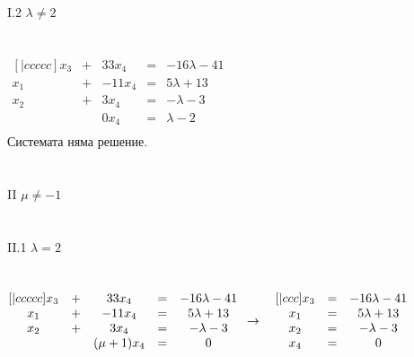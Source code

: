 \documentclass{article}
\begin{document}
    I.2 \(\lambda \neq 2\)\\
    \\
    \\
    \begin{math}
       \begin{matrix}[|ccccc]
            x_3 & + & 33x_4 & = & -16\lambda - 41\\
            x_1 & + & -11x_4 & = & 5\lambda + 13\\
            x_2 & + & 3x_4 & = & -\lambda - 3\\
            ~ & ~ & 0x_4 & = & \lambda - 2\\
        \end{matrix}
    \end{math}\\
    Системата няма решение.\\
    \\
    \\
    II \(\mu \neq -1\)\\
    \\
    \\
    II.1 \(\lambda = 2\)\\
    \\
    \\
    \begin{math}
       \begin{matrix}[|ccccc]
            x_3 & + & 33x_4 & = & -16\lambda - 41\\
            x_1 & + & -11x_4 & = & 5\lambda + 13\\
            x_2 & + & 3x_4 & = & -\lambda - 3\\
            ~ & ~ & (\mu + 1)x_4 & = & 0\\
        \end{matrix}\\
        \\
        \\
        \to\quad
        \begin{matrix}[|ccc]
            x_3 & = & -16\lambda - 41\\
            x_1 & = & 5\lambda + 13\\
            x_2 & = & -\lambda - 3\\
            x_4 & = & 0\\
        \end{matrix}\\
    \end{math}\\
    \\
\end{document}
